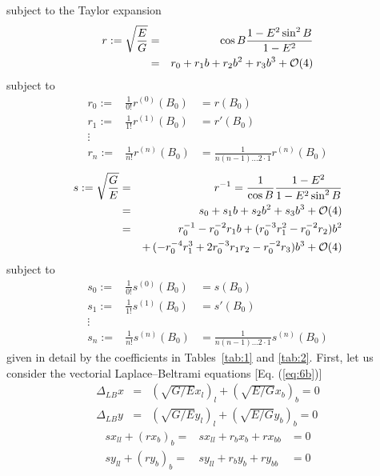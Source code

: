 \documentclass[jog]{svjour}
\begin{document}
\setcounter{equation}{7}%
\renewcommand{\theequation}{\arabic{equation}}%
subject to the Taylor expansion
\begin{eqnarray}
r := \sqrt{\frac{E}{G}} &= &\cos B\frac{1-E^2\sin^2B}{1-E^2} \nonumber \\
&= &r_0+r_1b+r_2b^2+r_3b^3+{\cal O}(4)
\label{eq:8}
\end{eqnarray}
subject to
\begin{eqnarray*}
r_0 := & {\frac{1}{0!}r^{(0)}(B_0)} & = r(B_0)\\
r_1 := & {\frac{1}{1!}r^{(1)}(B_0)} & = r'(B_0)\\
\vdots & &\\
r_n := & {\frac{1}{n!}r^{(n)}(B_0)} & = \frac{1}{n(n-1)...2\cdot 1}r^{(n)}(B_0)
\end{eqnarray*}
\begin{eqnarray}
s := {\sqrt{\frac{G}{E}}} &= &r^{-1} = \frac{1}{\cos B}\frac{1-E^2}{1-E^2\sin^2B}
\label{eq:9} \\
& = &s_0+s_1b+s_2b^2+s_3b^3+{\cal O}(4)
\nonumber \\
& = &r^{-1}_0-r^{-2}_0r_1b+(r^{-3}_0r^2_1-r^{-2}_0r_2)b^2
\nonumber \\
& & +\, (-r^{-4}_0r^3_1+2r^{-3}_0r_1r_2-r^{-2}_0r_3)b^3+{\cal O}(4)
\nonumber
\end{eqnarray}
subject to
\begin{eqnarray*}
s_0 := &{\frac{1}{0!}s^{(0)}(B_0)} & =s(B_0)\\
s_1 := &{\frac{1}{1!}s^{(1)}(B_0)} & =s'(B_0)\\
\vdots&&\\
s_n := &{\frac{1}{n!}s^{(n)}(B_0)} & =\frac{1}{n(n-1)...2\cdot 1}s^{(n)}(B_0)
\end{eqnarray*}
given in detail by the coefficients in Tables~\ref{tab:1} and
\ref{tab:2}. First, let us consider the vectorial Laplace--Beltrami
equations [Eq. (\ref{eq:6b})]
\begin{eqnarray*}
\Delta_{LB}x &= &(\sqrt{G/E}x_l)_l+(\sqrt{E/G}x_b)_b=0 \\
\Delta_{LB}y &= &(\sqrt{G/E}y_l)_l+(\sqrt{E/G}y_b)_b=0
\end{eqnarray*}
\setcounter{equation}{0}%
\renewcommand{\theequation}{10\alph{equation}}%
\begin{eqnarray}
sx_{ll}+(rx_b)_b= & sx_{ll}+r_bx_b+rx_{bb} & =0
\label{eq:10a}\\
sy_{ll}+(ry_b)_b= & sy_{ll}+r_by_b+ry_{bb} & =0
\label{eq:10b}
\end{eqnarray}
\setcounter{equation}{10}%
\renewcommand{\theequation}{\arabic{equation}}%
\end{document}
